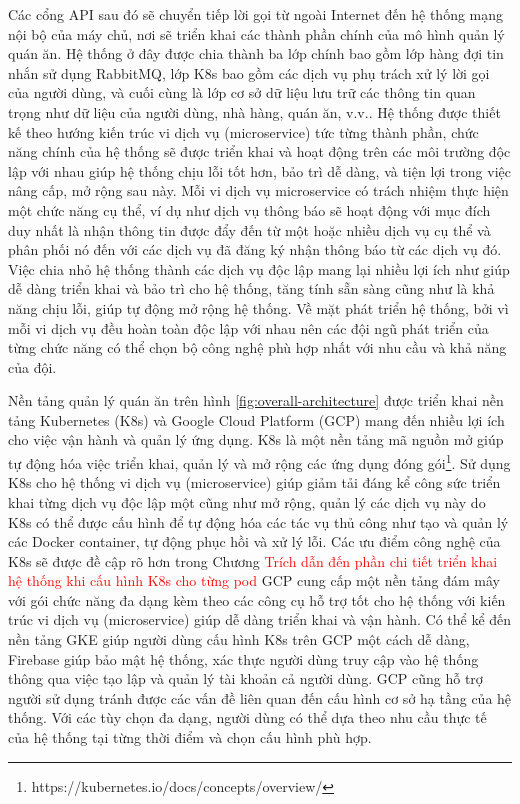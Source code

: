 Các cổng API sau đó sẽ chuyển tiếp lời gọi từ ngoài Internet đến hệ thống mạng nội bộ của máy chủ, nơi sẽ triển khai các thành phần chính của mô hình quản lý quán ăn.
Hệ thống ở đây được chia thành ba lớp chính bao gồm lớp hàng đợi tin nhắn sử dụng RabbitMQ, lớp K8s bao gồm các dịch vụ phụ trách xử lý lời gọi của người dùng, và cuối cùng là lớp cơ sở dữ liệu lưu trữ các thông tin quan trọng như dữ liệu của người dùng, nhà hàng, quán ăn, v.v..
Hệ thống được thiết kế theo hướng kiến trúc vi dịch vụ (microservice) tức từng thành phần, chức năng chính của hệ thống sẽ được triển khai và hoạt động trên các môi trường độc lập với nhau giúp hệ thống chịu lỗi tốt hơn, bảo trì dễ dàng, và tiện lợi trong việc nâng cấp, mở rộng sau này.
Mỗi vi dịch vụ microservice có trách nhiệm thực hiện một chức năng cụ thể, ví dụ như dịch vụ thông báo sẽ hoạt động với mục đích duy nhất là nhận thông tin được đẩy đến từ một hoặc nhiều dịch vụ cụ thể và phân phối nó đến với các dịch vụ đã đăng ký nhận thông báo từ các dịch vụ đó.
Việc chia nhỏ hệ thống thành các dịch vụ độc lập mang lại nhiều lợi ích như giúp dễ dàng triển khai và bảo trì cho hệ thống, tăng tính sẵn sàng cũng như là khả năng chịu lỗi, giúp tự động mở rộng hệ thống.
Về mặt phát triển hệ thống, bởi vì mỗi vi dịch vụ đều hoàn toàn độc lập với nhau nên các đội ngũ phát triển của từng chức năng có thể chọn bộ công nghệ phù hợp nhất với nhu cầu và khả năng của đội.

Nền tảng quản lý quán ăn trên hình \ref{fig:overall-architecture} được triển khai nền tảng Kubernetes (K8s) và Google Cloud Platform (GCP) mang đến nhiều lợi ích cho việc vận hành và quản lý ứng dụng.
K8s là một nền tảng mã nguồn mở giúp tự động hóa việc triển khai, quản lý và mở rộng các ứng dụng đóng gói\footnote{https://kubernetes.io/docs/concepts/overview/}.
Sử dụng K8s cho hệ thống vi dịch vụ (microservice) giúp giảm tải đáng kể công sức triển khai từng dịch vụ độc lập một cũng như mở rộng, quản lý các dịch vụ này do K8s có thể được cấu hình để tự động hóa các tác vụ thủ công như tạo và quản lý các Docker container, tự động phục hồi và xử lý lỗi.
Các ưu điểm công nghệ của K8s sẽ được đề cập rõ hơn trong Chương \textcolor{red}{Trích dẫn đến phần chi tiết triển khai hệ thống khi cấu hình K8s cho từng pod}
GCP cung cấp một nền tảng đám mây với gói chức năng đa dạng kèm theo các công cụ hỗ trợ tốt cho hệ thống với kiến trúc vi dịch vụ (microservice) giúp dễ dàng triển khai và vận hành.
Có thể kể đến nền tảng GKE giúp người dùng cấu hình K8s trên GCP một cách dễ dàng, Firebase giúp bảo mật hệ thống, xác thực người dùng truy cập vào hệ thống thông qua việc tạo lập và quản lý tài khoản cả người dùng.
GCP cũng hỗ trợ người sử dụng tránh được các vấn đề liên quan đến cấu hình cơ sở hạ tầng của hệ thống.
Với các tùy chọn đa dạng, người dùng có thể dựa theo nhu cầu thực tế của hệ thống tại từng thời điểm và chọn cấu hình phù hợp.

